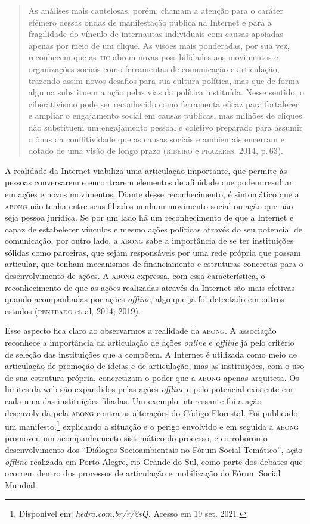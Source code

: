 \begin{quote}
As análises mais cautelosas, porém, chamam a atenção para o caráter
efêmero dessas ondas de manifestação pública na Internet e para a
fragilidade do vínculo de internautas individuais com causas apoiadas
apenas por meio de um clique. As visões mais ponderadas, por sua vez,
reconhecem que as \textsc{tic} abrem novas possibilidades aos movimentos e
organizações sociais como ferramentas de comunicação e articulação,
trazendo assim novos desafios para sua cultura política, mas que de
forma alguma substituem a ação pelas vias da política instituída. Nesse
sentido, o ciberativismo pode ser reconhecido como ferramenta eficaz
para fortalecer e ampliar o engajamento social em causas públicas, mas
milhões de cliques não substituem um engajamento pessoal e coletivo
preparado para assumir o ônus da conflitividade que as causas sociais e
ambientais encerram e dotado de uma visão de longo prazo (\textsc{ribeiro} e
\textsc{prazeres}, 2014, p.\,63).
\end{quote}

A realidade da Internet viabiliza uma articulação importante, que
permite às pessoas conversarem e encontrarem elementos de afinidade que
podem resultar em ações e novos movimentos. Diante desse reconhecimento,
é sintomático que a \textsc{abong} não tenha entre seus filiados nenhum movimento
social ou ação que não seja pessoa jurídica. Se por um lado há um
reconhecimento de que a Internet é capaz de estabelecer vínculos e mesmo
ações políticas através do seu potencial de comunicação, por outro lado,
a \textsc{abong} sabe a importância de se ter instituições sólidas como
parceiras, que sejam responsáveis por uma rede própria que possam
articular, que tenham mecanismos de financiamento e estruturas concretas
para o desenvolvimento de ações. A \textsc{abong} expressa, com essa
característica, o reconhecimento de que as ações realizadas através da
Internet são mais efetivas quando acompanhadas por ações \textit{offline}, algo
que já foi detectado em outros estudos (\textsc{penteado} et al, 2014; 2019).

Esse aspecto fica claro ao observarmos a realidade da \textsc{abong}. A
associação reconhece a importância da articulação de ações \textit{online} e
\textit{offline} já pelo critério de seleção das instituições que a compõem. A
Internet é utilizada como meio de articulação de promoção de ideias e de
articulação, mas as instituições, com o uso de sua estrutura própria,
concretizam o poder que a \textsc{abong} apenas arquiteta. Os limites da web são
expandidos pelas ações \textit{offline} e pelo potencial existente em cada uma
das instituições filiadas. Um exemplo interessante foi a ação
desenvolvida pela \textsc{abong} contra as alterações do Código Florestal. Foi
publicado um manifesto.\footnote{Disponível em:
  \textit{hedra.com.br/r/2sQ.}
  Acesso em 19 set. 2021.} explicando a situação e o perigo envolvido e em
seguida a \textsc{abong} promoveu um acompanhamento sistemático do processo, e
corroborou o desenvolvimento dos ``Diálogos Socioambientais no Fórum
Social Temático'', ação \textit{offline} realizada em Porto Alegre, rio Grande
do Sul, como parte dos debates que ocorrem dentro dos processos de
articulação e mobilização do Fórum Social Mundial.


